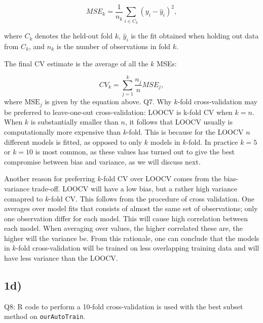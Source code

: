 \documentclass[]{article}
\begin{document}
\[
MSE_k=\frac{1}{n_k}\sum_{i \in C_k}(y_i-\hat y_i)^2,
\]

where \(C_k\) denotes the held-out fold \(k\), \(\hat y_i\) is the fit
obtained when holding out data from \(C_k\), and \(n_k\) is the number
of observations in fold \(k\).

The final CV estimate is the average of all the \(k\) MSEs:

\[
CV_k=\sum_{j=1}^k \frac{n_j}{n}MSE_j,
\] where \(\text{MSE}_j\) is given by the equation above. Q7. Why
\(k\)-fold cross-validation may be preferred to leave-one-out
cross-validation: LOOCV is k-fold CV when \(k=n\). When \(k\) is
substantially smaller than \(n\), it follows that LOOCV usually is
computationally more expensive than \(k\)-fold. This is because for the
LOOCV \(n\) different models is fitted, as opposed to only \(k\) models
in \(k\)-fold. In practice \(k=5\) or \(k=10\) is most common, as these
values has turned out to give the best compromise between bias and
variance, as we will discuss next.

Another reason for preferring \(k\)-fold CV over LOOCV comes from the
bias-variance trade-off. LOOCV will have a low bias, but a rather high
variance comapred to \(k\)-fold CV. This follows from the procedure of
cross validation. One averages over model fits that consists of almost
the same set of observations; only one observation differ for each
model. This will cause high correlation between each model. When
averaging over values, the higher correlated these are, the higher will
the variance be. From this rationale, one can conclude that the models
in \(k\)-fold cross-validation will be trained on less overlapping
training data and will have less variance than the LOOCV.

\subsection{1d)}\label{d}

Q8: R code to perform a 10-fold cross-validation is used with the best
subset method on \texttt{ourAutoTrain}.
\end{document}
